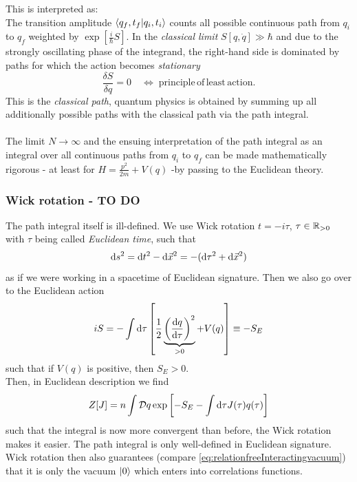 This is interpreted as:\\
The transition amplitude $\braket{q_f,t_f}{q_i,t_i}$ counts all possible continuous path from $q_i$ to $q_f$ weighted by $\exp\left[\frac{i}{\hbar} S\right]$. In the \emph{classical limit} $S[q,\dot{q}] \gg \hbar$ and due to the strongly oscillating phase of the integrand, the right-hand side is dominated by paths for which the action becomes \emph{stationary}
\begin{equation}
	\frac{\delta S}{\delta q} =0 \quad \Leftrightarrow \; \mathrm{principle\,of\,least\, action}.
\end{equation}
This is the \emph{classical path}, quantum physics is obtained by summing up all additionally possible paths with the classical path via the path integral.\\
\\
The limit $N\rightarrow\infty$ and the ensuing interpretation of the path integral as an integral over all continuous paths from $q_i$ to $q_f$ can be made mathematically rigorous - at least for $H=\frac{p^2}{2m} +V(q)$ -by passing to the Euclidean theory.
\subsubsection{Wick rotation - TO DO}
The path integral itself is ill-defined. We use Wick rotation $t=-i \tau$, $\tau \in \mathbb{R}_{>0}$ with $\tau$ being called \emph{Euclidean time}, such that 
\begin{equation*}
	\mathrm{d} s^2 = \mathrm{d} t^2 - \mathrm{d} \vec{x}^2 = - (\mathrm{d} \tau^2 + \mathrm{d} \vec{x}^2)
\end{equation*}
as if we were working in a spacetime of Euclidean signature. Then we also go over to the Euclidean action
\begin{equation*}
	iS=- \int \mathrm{d} \tau \left[\frac{1}{2} \underbrace{\left(\frac{\mathrm{d} q}{\mathrm{d} \tau}\right)^2}_{>0} +V(q)\right] \equiv - S_E
\end{equation*}
such that if $V(q)$ is positive, then $S_E>0$.\\
Then, in Euclidean description we find
\begin{equation*}
	Z[J] = n \int \mathcal{D} q \exp \left[-S_E - \int \mathrm{d} \tau J(\tau) q(\tau)\right]
\end{equation*}
such that the integral is now more convergent than before, the Wick rotation makes it easier. The path integral is only well-defined in Euclidean signature. Wick rotation then also guarantees (compare \ref{eq:relationfreeInteractingvacuum}) that it is only the vacuum $\ket{0}$ which enters into correlations functions.
